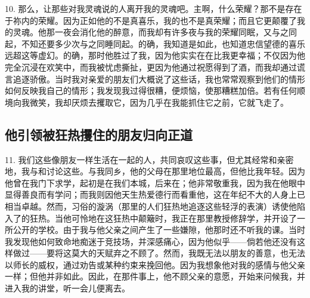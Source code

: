 10. 那么，让那些对我灵魂说的人离开我的灵魂吧。主啊，什么荣耀？那不是存在于祢内的荣耀。因为正如他的不是真喜乐，我的也不是真荣耀；而且它更颠覆了我的灵魂。他那一夜会消化他的醉意，而我却有许多夜与我的荣耀同眠，又与之同起，不知还要多少次与之同睡同起。的确，我知道是如此，也知道忠信望德的喜乐远超这等虚幻。的确，那时他胜过了我，因为他实实在在比我更幸福；不仅因为他完全沉浸在欢笑中，而我被忧虑撕扯，更因为他通过祝愿得到了酒，而我却通过谎言追逐骄傲。当时我对亲爱的朋友们大概说了这些话，我也常常观察到他们的情形如何反映我自己的情形；我发现我过得很糟，便烦恼，使那糟糕加倍。若有任何顺境向我微笑，我却厌烦去攫取它，因为几乎在我能抓住它之前，它就飞走了。\par


\subsection{他引领被狂热攫住的朋友归向正道}

11. 我们这些像朋友一样生活在一起的人，共同哀叹这些事，但尤其经常和亲密地，我与和讨论这些。与我同乡，他的父母在那里地位最高，但他比我年轻。因为他曾在我门下求学，起初是在我们本城，后来在；他非常敬重我，因为我在他眼中显得善良而有学问；而我则因他天生热爱德行而看重他，这在年纪不大的人身上已相当卓越。然而，习俗的漩涡（那里的人们狂热地追逐这些轻浮的表演）诱使他陷入了的狂热。当他可怜地在这狂热中颠簸时，我正在那里教授修辞学，并开设了一所公开的学校。由于我与他父亲之间产生了一些嫌隙，他那时还不听我的课。当时我发现他如何致命地痴迷于竞技场，并深感痛心，因为他似乎——倘若他还没有这样做过——要将这莫大的天赋弃之不顾了。然而，我既无法以朋友的善意，也无法以师长的威权，通过劝告或某种约束来挽回他。因为我想象他对我的感情与他父亲一样；但他并非如此。因此，在那件事上，他不顾父亲的意愿，开始来问候我，并进入我的讲堂，听一会儿便离去。\par

